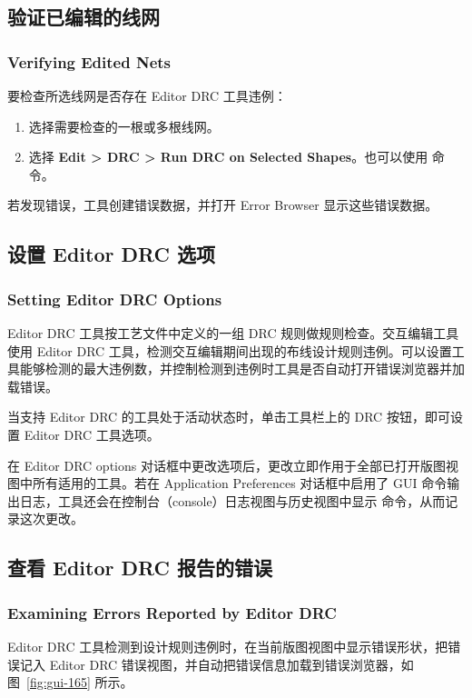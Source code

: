 \subsection{验证已编辑的线网}
\subsubsection*{Verifying Edited Nets}

要检查所选线网是否存在 Editor DRC 工具违例：
\begin{enumerate}
  \item 选择需要检查的一根或多根线网。
  \item 选择 \textbf{Edit > DRC > Run DRC on Selected Shapes}。也可以使用  命令。
\end{enumerate}

若发现错误，工具创建错误数据，并打开 Error Browser 显示这些错误数据。

\subsection{设置 Editor DRC 选项}
\subsubsection*{Setting Editor DRC Options}

Editor DRC 工具按工艺文件中定义的一组 DRC 规则做规则检查。交互编辑工具使用 Editor DRC 工具，检测交互编辑期间出现的布线设计规则违例。可以设置工具能够检测的最大违例数，并控制检测到违例时工具是否自动打开错误浏览器并加载错误。

当支持 Editor DRC 的工具处于活动状态时，单击工具栏上的 DRC 按钮，即可设置 Editor DRC 工具选项。

在 Editor DRC options 对话框中更改选项后，更改立即作用于全部已打开版图视图中所有适用的工具。若在 Application Preferences 对话框中启用了 GUI 命令输出日志，工具还会在控制台（console）日志视图与历史视图中显示  命令，从而记录这次更改。

\subsection{查看 Editor DRC 报告的错误}
\subsubsection*{Examining Errors Reported by Editor DRC}

Editor DRC 工具检测到设计规则违例时，在当前版图视图中显示错误形状，把错误记入 Editor DRC 错误视图，并自动把错误信息加载到错误浏览器，如图~\ref{fig:gui-165} 所示。

